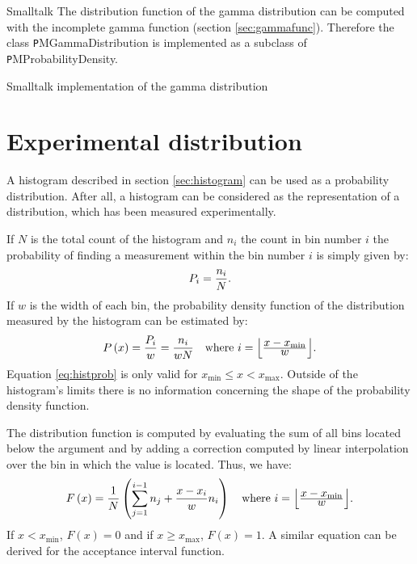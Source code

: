 \begin{displaycode}{Smalltalk}
The distribution function of the gamma distribution can be
computed with the incomplete gamma function (\cf section
\ref{sec:gammafunc}). Therefore the class {\texttt
PMGammaDistribution} is implemented as a subclass of {\texttt
PMProbabilityDensity}.
\begin{listing} Smalltalk implementation of the gamma distribution \label{ls:gammadist}

\end{listing}


\section{Experimental distribution}
A histogram described in section \ref{sec:histogram} can be used
as a probability distribution. After all, a histogram can be
considered as the representation of a distribution, which has been
measured experimentally.

If $N$ is the total count of the histogram and $n_i$ the count in
bin number $i$ the probability of finding a measurement within the
bin number $i$ is simply given by:
\begin{equation}
  P_i={\displaystyle n_i \over\displaystyle N}.
\end{equation}
If $w$ is the width of each bin, the probability density function
of the distribution measured by the histogram can be estimated by:
\begin{equation}
\label{eq:histprob}
  P\left(x\right)={\displaystyle P_i \over\displaystyle w}
  ={\displaystyle n_i \over\displaystyle wN}\mbox{\quad
  where $i=\left\lfloor{\displaystyle x-x_{\min}\over\displaystyle w}\right\rfloor$.}
\end{equation}
Equation \ref{eq:histprob} is only valid for $x_{\min}\le x <
x_{\max}$. Outside of the histogram's limits there is no
information concerning the shape of the probability density
function.

The distribution function is computed by evaluating the sum of all
bins located below the argument and by adding a correction
computed by linear interpolation over the bin in which the value
is located. Thus, we have:
\begin{equation}
\label{eq:histdistr}
  F\left(x\right)={\displaystyle 1 \over\displaystyle N} \left(\sum_{j=1}^{i-1}n_j
  + {x-x_i \over w}n_i\right)
  \mbox{\quad where $i=\left\lfloor{\displaystyle x-x_{\min}\over\displaystyle w}\right\rfloor$.}
\end{equation}
If $x<x_{\min}$, $F\left(x\right)=0$ and if $x\geq x_{\max}$,
$F\left(x\right)=1$. A similar equation can be derived for the
acceptance interval function.


\end{displaycode}
